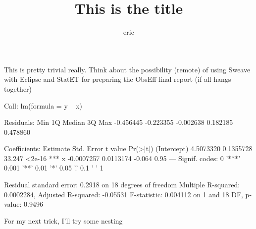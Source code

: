 \documentclass[a4paper]{article}
\begin{document}
\title{This is the title}
\author{eric}

\maketitle

This is pretty trivial really.  Think about the possibility (remote) of using Sweave with Eclipse and StatET
for preparing the ObsEff final report (if all hangs together)
\begin{Schunk}
\begin{Soutput}
Call:
lm(formula = y ~ x)

Residuals:
      Min        1Q    Median        3Q       Max 
-0.456445 -0.223355 -0.002638  0.182185  0.478860 

Coefficients:
              Estimate Std. Error t value Pr(>|t|)    
(Intercept)  4.5073320  0.1355728  33.247   <2e-16 ***
x           -0.0007257  0.0113174  -0.064     0.95    
---
Signif. codes:  0 '***' 0.001 '**' 0.01 '*' 0.05 '.' 0.1 ' ' 1 

Residual standard error: 0.2918 on 18 degrees of freedom
Multiple R-squared: 0.0002284,	Adjusted R-squared: -0.05531 
F-statistic: 0.004112 on 1 and 18 DF,  p-value: 0.9496 
\end{Soutput}
\end{Schunk}

For my next trick, I'll try some nesting
\end{document}
